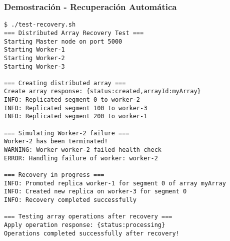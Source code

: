\documentclass{beamer}
\begin{document}
\begin{frame}[fragile]
\frametitle{Demostración - Recuperación Automática}
\begin{lstlisting}[style=terminal]
$ ./test-recovery.sh
=== Distributed Array Recovery Test ===
Starting Master node on port 5000
Starting Worker-1
Starting Worker-2
Starting Worker-3

=== Creating distributed array ===
Create array response: {status:created,arrayId:myArray}
INFO: Replicated segment 0 to worker-2
INFO: Replicated segment 100 to worker-3
INFO: Replicated segment 200 to worker-1

=== Simulating Worker-2 failure ===
Worker-2 has been terminated!
WARNING: Worker worker-2 failed health check
ERROR: Handling failure of worker: worker-2

=== Recovery in progress ===
INFO: Promoted replica worker-1 for segment 0 of array myArray
INFO: Created new replica on worker-3 for segment 0
INFO: Recovery completed successfully

=== Testing array operations after recovery ===
Apply operation response: {status:processing}
Operations completed successfully after recovery!
\end{lstlisting}
\end{frame}
\end{document}
